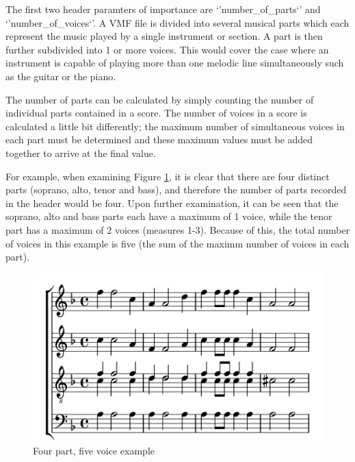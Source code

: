 The first two header paramters of importance are `'number\_of\_parts`' and `'number\_of\_voices`'. A VMF file is divided into several musical parts which each represent the music played by a single instrument or section. A part is then further subdivided into 1 or more voices. This would cover the case where an instrument is capable of playing more than one melodic line simultaneously such as the guitar or the piano.

The number of parts can be calculated by simply counting the number of individual parts contained in a score. The number of voices in a score is calculated a little bit differently; the maximum number of simultaneous voices in each part must be determined and these maximum values must be added together to arrive at the final value.

For example, when examining Figure \ref{fig:voicesExample}, it is clear that there are four distinct parts (soprano, alto, tenor and bass), and therefore the number of parts recorded in the header would be four. Upon further examination, it can be seen that the soprano, alto and bass parts each have a maximum of 1 voice, while the tenor part has a maximum of 2 voices (measures 1-3). Because of this, the total number of voices in this example is five (the sum of the maximm number of voices in each part).



\begin{figure}
  \begin{center}
    \includegraphics[scale=0.75]{lilypond/voices}
    \caption{Four part, five voice example}
    \label{fig:voicesExample}
  \end{center}
\end{figure}